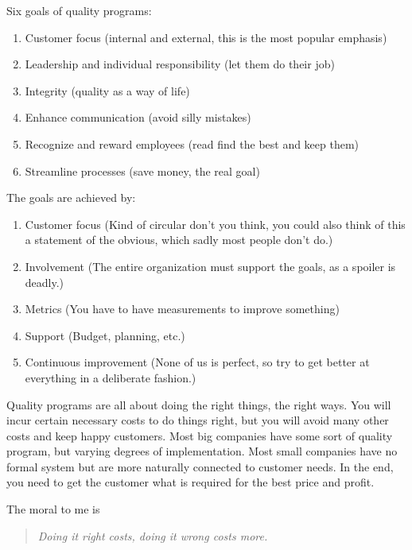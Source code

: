 Six goals of quality programs:
\begin{enumerate}
\item Customer focus (internal and external, this is the most popular emphasis)
\item Leadership and individual responsibility (let them do their job)
\item Integrity (quality as a way of life)
\item Enhance communication (avoid silly mistakes)
\item Recognize and reward employees (read find the best and keep them)
\item Streamline processes (save money, the real goal)
\end{enumerate}
The goals are achieved by:
\begin{enumerate}
\item Customer focus (Kind of circular don't you think, you could also think of this a statement of the obvious, which sadly most people don't do.)
\item Involvement (The entire organization must support the goals, as a spoiler is deadly.)
\item Metrics (You have to have measurements to improve something)
\item Support (Budget, planning, etc.)
\item Continuous improvement (None of us is perfect, so try to get better at everything in a deliberate fashion.)
\end{enumerate}

Quality programs are all about doing the right things, the right ways. You will incur certain necessary costs to do things right, but you will avoid many other costs and keep happy customers.  Most big companies have some sort of quality program, but varying degrees of implementation.  Most small companies have no formal system but are more naturally connected to customer needs.  In the end, you need to get the customer what is required for the best price and profit.

The moral to me is
\begin{quote}
\emph{Doing it right costs, doing it wrong costs more.}
\end{quote}

